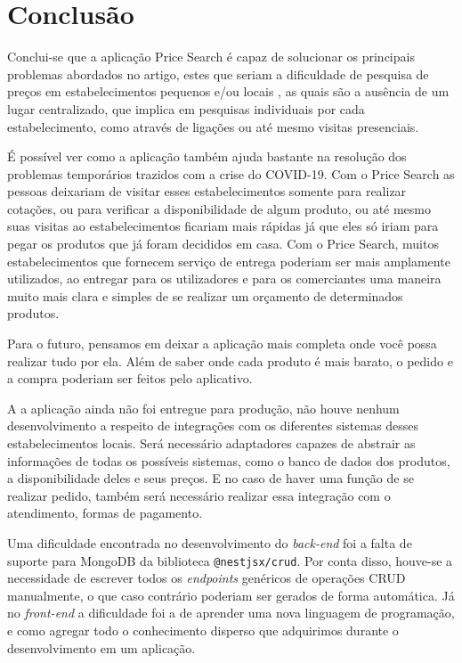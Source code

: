 \section{Conclusão}
\label{sec:conclusao}

Conclui-se que a aplicação Price Search é capaz de solucionar os principais problemas abordados no artigo, estes que seriam a dificuldade de pesquisa de preços em estabelecimentos pequenos e/ou locais , as quais são a ausência de um lugar centralizado, que implica em pesquisas individuais por cada estabelecimento, como através de ligações ou até mesmo visitas presenciais. 

É possível ver como a aplicação também ajuda bastante na resolução dos problemas temporários trazidos com a crise do COVID-19. Com o Price Search as pessoas deixariam de visitar esses estabelecimentos somente para realizar cotações, ou para verificar a disponibilidade de algum produto, ou até mesmo suas visitas ao estabelecimentos ficariam mais rápidas já que eles só iriam para pegar os produtos que já foram decididos em casa. Com o Price Search, muitos estabelecimentos que fornecem serviço de entrega poderiam ser mais amplamente utilizados, ao entregar para os utilizadores e para os comerciantes uma maneira muito mais clara e simples de se realizar um orçamento de determinados produtos.

Para o futuro, pensamos em deixar a aplicação mais completa onde você possa realizar tudo por ela. Além de saber onde cada produto é mais barato, o pedido e a compra poderiam ser feitos pelo aplicativo.

A a aplicação ainda não foi entregue para produção, não houve nenhum desenvolvimento a respeito de integrações com os diferentes sistemas desses estabelecimentos locais. Será necessário adaptadores capazes de abstrair as informações de todas os possíveis sistemas, como o banco de dados dos produtos, a disponibilidade deles e seus preços. E no caso de haver uma função de se realizar pedido, também será necessário realizar essa integração com o atendimento, formas de pagamento.

Uma dificuldade encontrada no desenvolvimento do \textit{back-end} foi a falta de suporte para MongoDB da biblioteca \texttt{@nestjsx/crud}. Por conta disso, houve-se a necessidade de escrever todos os \textit{endpoints} genéricos de operações CRUD manualmente, o que caso contrário poderiam ser gerados de forma automática. Já no \textit{front-end} a dificuldade foi a de aprender uma nova linguagem de programação, e como agregar todo o conhecimento disperso que adquirimos durante o desenvolvimento em um aplicação.

\begin{comment}
Aqui também é um comentário
\end{comment}